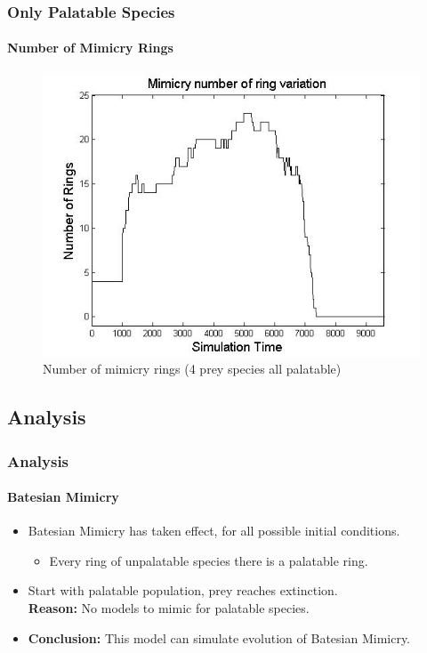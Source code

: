 \frame
{
	\frametitle{Only Palatable Species}
	\framesubtitle{Number of Mimicry Rings}

	\begin{figure}[H]
		\centering
		\includegraphics[scale=0.3]{../tex/images/ringSize10k-4Prey-p}
		\caption{Number of mimicry rings (4 prey species all palatable)}
		\label{fig:ringSize8k-4-Prey-p}
	\end{figure}
}

\subsection{Analysis}

\frame
{
	\frametitle{Analysis}
	\framesubtitle{Batesian Mimicry}

	\begin{itemize}
		\item Batesian Mimicry has taken effect, for all possible initial conditions.
			\begin{itemize}
				\item Every ring of unpalatable species there is a palatable ring.
			\end{itemize}
	\end{itemize}

	\begin{itemize}
		\item Start with palatable population, prey reaches extinction.\\
		\textbf{Reason:} No models to mimic for palatable species.
	\end{itemize}

	\begin{itemize}
		\item \textbf{Conclusion:} This model can simulate evolution of Batesian Mimicry.
	\end{itemize}

}

